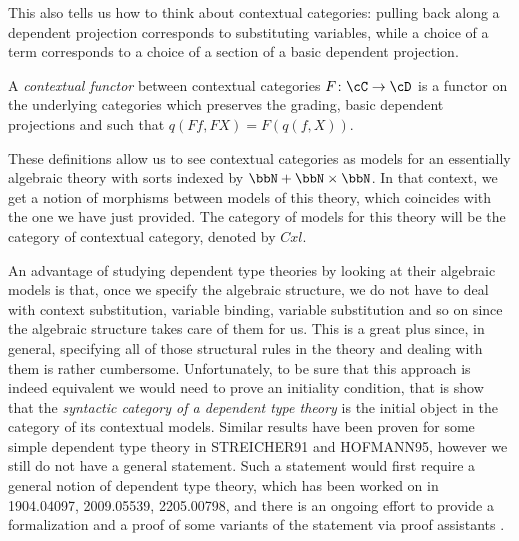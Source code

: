 \documentclass[a4paper,fontsize=12pt]{scrartcl}
\begin{document}
This also tells us how to think about contextual categories: pulling back along
a dependent projection corresponds to substituting variables, while a choice of
a term corresponds to a choice of a section of a basic dependent projection.

\begin{defn}
  A \emph{contextual functor} between contextual categories
  $F\colon\cC\rightarrow\cD$ is a functor on the underlying categories which
  preserves the grading, basic dependent projections and such that
  $q(Ff,FX)=F(q(f,X))$.
\end{defn}

\begin{rmk}
  These definitions allow us to see contextual categories as models for an
  essentially algebraic theory with sorts indexed by $\bbN+\bbN\times\bbN$. In
  that context, we get a notion of morphisms between models of this theory,
  which coincides with the one we have just provided. The category of models for
  this theory will be the category of contextual category, denoted by $Cxl$.
\end{rmk}

\begin{rmk}
  An advantage of studying dependent type theories by looking at their algebraic
  models is that, once we specify the algebraic structure, we do not have to
  deal with context substitution, variable binding, variable substitution and so
  on since the algebraic structure takes care of them for us. This is a great
  plus since, in general, specifying all of those structural rules in the
  theory and dealing with them is rather cumbersome. Unfortunately, to be sure
  that this approach is indeed equivalent we would need to prove an initiality
  condition, that is show that the \emph{syntactic category of a dependent type
  theory} is the initial object in the category of its contextual models.
  Similar results have been proven for some simple dependent type theory in
  STREICHER91 and HOFMANN95, however we still do not have a general statement.
  Such a statement would first require a general notion of dependent type
  theory, which has been worked on in 1904.04097, 2009.05539, 2205.00798, and
  there is an ongoing effort to provide a formalization and a proof of some
  variants of the statement via proof assistants .
\end{rmk}
\end{document}
